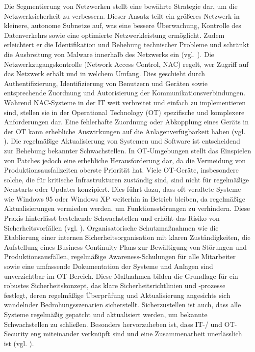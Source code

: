 Die Segmentierung von Netzwerken stellt eine bewährte Strategie dar, um die Netzwerksicherheit zu verbessern. Dieser Ansatz teilt ein größeres Netzwerk in kleinere, autonome Subnetze auf, was eine bessere Überwachung, Kontrolle des Datenverkehrs sowie eine optimierte Netzwerkleistung ermöglicht. Zudem erleichtert er die Identifikation und Behebung technischer Probleme und schränkt die Ausbreitung von Malware innerhalb des Netzwerks ein (vgl. \cite{Netzwerksegmentierung}). Die Netzwerkzugangskontrolle (Network Access Control, NAC) regelt, wer Zugriff auf das Netzwerk erhält und in welchem Umfang. Dies geschieht durch Authentifizierung, Identifizierung von Benutzern und Geräten sowie entsprechende Zuordnung und Autorisierung der Kommunikationsverbindungen. Während NAC-Systeme in der IT weit verbreitet und einfach zu implementieren sind, stellen sie in der Operational Technology (OT) spezifische und komplexere Anforderungen dar. Eine fehlerhafte Zuordnung oder Abkopplung eines Geräts in der OT kann erhebliche Auswirkungen auf die Anlagenverfügbarkeit haben (vgl. \cite{NAC}). Die regelmäßige Aktualisierung von Systemen und Software ist entscheidend zur Behebung bekannter Schwachstellen. In OT-Umgebungen stellt das Einspielen von Patches jedoch eine erhebliche Herausforderung dar, da die Vermeidung von Produktionsausfallzeiten oberste Priorität hat. Viele OT-Geräte, insbesondere solche, die für kritische Infrastrukturen zuständig sind, sind nicht für regelmäßige Neustarts oder Updates konzipiert. Dies führt dazu, dass oft veraltete Systeme wie Windows 95 oder Windows XP weiterhin in Betrieb bleiben, da regelmäßige Aktualisierungen vermieden werden, um Funktionsstörungen zu verhindern. Diese Praxis hinterlässt bestehende Schwachstellen und erhöht das Risiko von Sicherheitsvorfällen (vgl. \cite{conscia}). 
\noindent Organisatorische Schutzmaßnahmen wie die Etablierung einer internen Sicherheitsorganisation mit klaren Zuständigkeiten, die Aufstellung eines Business Continuity Plans zur Bewältigung von Störungen und Produktionsausfällen, regelmäßige Awareness-Schulungen für alle Mitarbeiter sowie eine umfassende Dokumentation der Systeme und Anlagen sind unverzichtbar im OT-Bereich. Diese Maßnahmen bilden die Grundlage für ein robustes Sicherheitskonzept, das klare Sicherheitsrichtlinien und -prozesse festlegt, deren regelmäßige Überprüfung und Aktualisierung angesichts sich wandelnder Bedrohungsszenarien sicherstellt. Sicherzustellen ist auch, dass alle Systeme regelmäßig gepatcht und aktualisiert werden, um bekannte Schwachstellen zu schließen. Besonders hervorzuheben ist, dass IT-/ und OT-Security eng miteinander verknüpft sind und eine Zusammenarbeit unerlässlich ist (vgl. \cite{orga}). 

